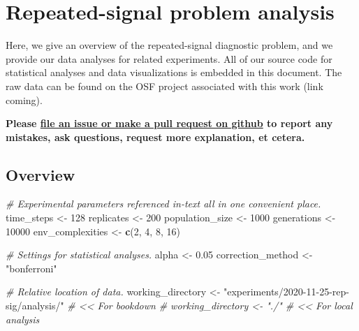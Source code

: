 \documentclass[
]{book}
\newenvironment{Shaded}{\begin{snugshade}}{\end{snugshade}}
\newcommand{\CommentTok}[1]{\textcolor[rgb]{0.56,0.35,0.01}{\textit{#1}}}
\newcommand{\DecValTok}[1]{\textcolor[rgb]{0.00,0.00,0.81}{#1}}
\newcommand{\FloatTok}[1]{\textcolor[rgb]{0.00,0.00,0.81}{#1}}
\newcommand{\KeywordTok}[1]{\textcolor[rgb]{0.13,0.29,0.53}{\textbf{#1}}}
\newcommand{\NormalTok}[1]{#1}
\newcommand{\StringTok}[1]{\textcolor[rgb]{0.31,0.60,0.02}{#1}}
\begin{document}
\hypertarget{repeated-signal-problem-analysis}{%
\chapter{Repeated-signal problem analysis}\label{repeated-signal-problem-analysis}}

Here, we give an overview of the repeated-signal diagnostic problem, and we provide our data analyses for related experiments.
All of our source code for statistical analyses and data visualizations is embedded in this document.
The raw data can be found on the OSF project associated with this work (link coming).

\textbf{Please \href{https://github.com/amlalejini/Tag-based-Genetic-Regulation-for-LinearGP/issues}{file an issue or make a pull request on github} to report any mistakes, ask questions, request more explanation, et cetera.}

\hypertarget{overview-1}{%
\section{Overview}\label{overview-1}}

\begin{Shaded}
\begin{Highlighting}[]
\CommentTok{\# Experimental parameters referenced in{-}text all in one convenient place.}
\NormalTok{time\_steps \textless{}{-}}\StringTok{ }\DecValTok{128}
\NormalTok{replicates \textless{}{-}}\StringTok{ }\DecValTok{200}
\NormalTok{population\_size \textless{}{-}}\StringTok{ }\DecValTok{1000}
\NormalTok{generations \textless{}{-}}\StringTok{ }\DecValTok{10000}
\NormalTok{env\_complexities \textless{}{-}}\StringTok{ }\KeywordTok{c}\NormalTok{(}\DecValTok{2}\NormalTok{, }\DecValTok{4}\NormalTok{, }\DecValTok{8}\NormalTok{, }\DecValTok{16}\NormalTok{)}

\CommentTok{\# Settings for statistical analyses.}
\NormalTok{alpha \textless{}{-}}\StringTok{ }\FloatTok{0.05}
\NormalTok{correction\_method \textless{}{-}}\StringTok{ "bonferroni"}

\CommentTok{\# Relative location of data.}
\NormalTok{working\_directory \textless{}{-}}\StringTok{ "experiments/2020{-}11{-}25{-}rep{-}sig/analysis/"} \CommentTok{\# \textless{}\textless{} For bookdown}
\CommentTok{\# working\_directory \textless{}{-} "./"                                     \# \textless{}\textless{} For local analysis}
\end{Highlighting}
\end{Shaded}
\end{document}
